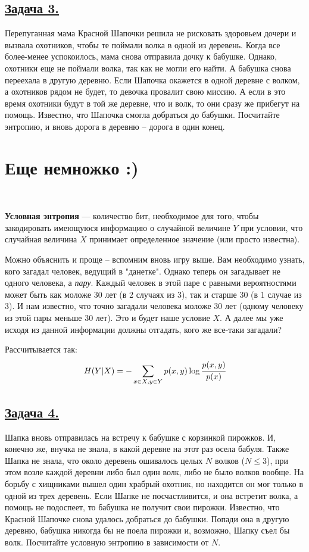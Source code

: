 \subsection*{\hyperref[sec:sol_problem3]{Задача 3.}}\label{sec:problem3} Перепуганная мама Красной Шапочки решила не рисковать здоровьем дочери и вызвала охотников, чтобы те поймали волка в одной из деревень. Когда все более-менее успокоилось, мама снова отправила дочку к бабушке. Однако, охотники еще не поймали волка, так как не могли его найти. А бабушка снова переехала в другую деревню. Если Шапочка окажется в одной деревне с волком, а охотников рядом не будет, то девочка провалит свою миссию. А если в это время охотники будут в той же деревне, что и волк, то они сразу же прибегут на помощь. Известно, что Шапочка смогла добраться до бабушки. Посчитайте энтропию, и вновь дорога в деревню -- дорога в один конец.

\section*{Еще немножко :)}~\
\\

\begin{siderules}
    \textbf{Условная энтропия} --- количество бит, необходимое для того, чтобы закодировать имеющуюся информацию о случайной величине $Y$ при условии, что случайная величина $X$ принимает определенное значение (или просто известна).
\end{siderules}

Можно объяснить и проще -- вспомним вновь игру выше. Вам необходимо узнать, кого загадал человек, ведущий в "данетке". Однако теперь он загадывает не одного человека, а \textit{пару}. Каждый человек в этой паре с равными вероятностями может быть как моложе 30 лет (в 2 случаях из 3), так и старше 30 (в 1 случае из 3). И нам известно, что точно загадали человека моложе 30 лет (одному человеку из этой пары меньше 30 лет). Это и будет наше условие $X$. А далее мы уже исходя из данной информации должны отгадать, кого же все-таки загадали?

Рассчитывается так:
\[H(Y|X)=-\sum\limits_{x\in X, y\in Y} p(x, y)\log \cfrac{p(x, y)}{p(x)} \]

\subsection*{\hyperref[sec:sol_problem4]{Задача 4.}}\label{sec:problem4} Шапка вновь отправилась на встречу к бабушке с корзинкой пирожков. И, конечно же, внучка не знала, в какой деревне на этот раз осела бабуля. Также Шапка не знала, что около деревень ошивалось целых $N$ волков ($N\leqslant3$), при этом возле каждой деревни либо был один волк, либо не было волков вообще. На борьбу с хищниками вышел один храбрый охотник, но находится он мог только в одной из трех деревень. Если Шапке не посчастливится, и она встретит волка, а помощь не подоспеет, то бабушка не получит свои пирожки. Известно, что Красной Шапочке снова удалось добраться до бабушки. Попади она в другую деревню, бабушка никогда бы не поела пирожки и, возможно, Шапку съел бы волк. Посчитайте условную энтропию в зависимости от $N$. 
\\

